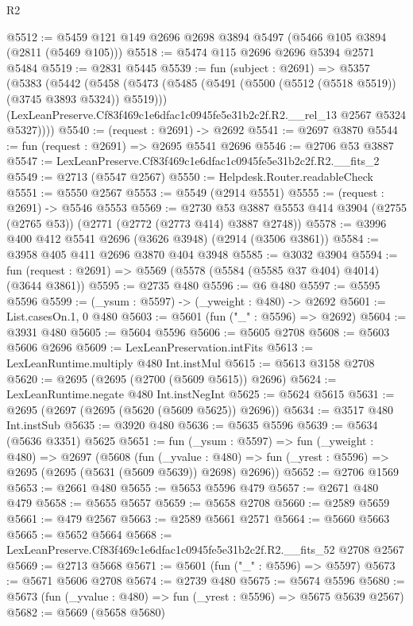 \begin{lexlean}{R2}
\begin{coremodule}
@5512 := @5459 @121 @149 @2696 @2698 @3894 @5497 (@5466 @105 @3894 (@2811 (@5469 @105)))
@5518 := @5474 @115 @2696 @2696 @5394 @2571 @5484
@5519 := @2831 @5445
@5539 := fun (subject : @2691) =>
  @5357
    (@5383
      (@5442
        (@5458
          (@5473 (@5485 (@5491 (@5500 (@5512 (@5518 @5519)) (@3745 @3893 @5324)) @5519)))
          (LexLeanPreserve.Cf83f469c1e6dfac1c0945fe5e31b2c2f.R2.__rel_13 @2567 @5324 @5327))))
@5540 := (request : @2691) -> @2692
@5541 := @2697 @3870
@5544 := fun (request : @2691) => @2695 @5541 @2696
@5546 := @2706 @53 @3887
@5547 := LexLeanPreserve.Cf83f469c1e6dfac1c0945fe5e31b2c2f.R2.__fits_2
@5549 := @2713 (@5547 @2567)
@5550 := Helpdesk.Router.readableCheck
@5551 := @5550 @2567
@5553 := @5549 (@2914 @5551)
@5555 := (request : @2691) -> @5546 @5553
@5569 := @2730
    @53
    @3887
    @5553
    @414
    @3904
    (@2755 (@2765 @53))
    (@2771 (@2772 (@2773 @414) @3887 @2748))
@5578 := @3996 @400 @412 @5541 @2696 (@3626 @3948) (@2914 (@3506 @3861))
@5584 := @3958 @405 @411 @2696 @3870 @404 @3948
@5585 := @3032 @3904
@5594 := fun (request : @2691) => @5569 (@5578 (@5584 (@5585 @37 @404) @4014) (@3644 @3861))
@5595 := @2735 @480
@5596 := @6 @480
@5597 := @5595 @5596
@5599 := (_ysum : @5597) -> (_yweight : @480) -> @2692
@5601 := List.casesOn.{1, 0} @480
@5603 := @5601 (fun ("_" : @5596) => @2692)
@5604 := @3931 @480
@5605 := @5604 @5596
@5606 := @5605 @2708
@5608 := @5603 @5606 @2696
@5609 := LexLeanPreservation.intFits
@5613 := LexLeanRuntime.multiply @480 Int.instMul
@5615 := @5613 @3158 @2708
@5620 := @2695 (@2695 (@2700 (@5609 @5615)) @2696)
@5624 := LexLeanRuntime.negate @480 Int.instNegInt
@5625 := @5624 @5615
@5631 := @2695 (@2697 (@2695 (@5620 (@5609 @5625)) @2696))
@5634 := @3517 @480 Int.instSub
@5635 := @3920 @480
@5636 := @5635 @5596
@5639 := @5634 (@5636 @3351) @5625
@5651 := fun (_ysum : @5597) =>
  fun (_yweight : @480) =>
  @2697
    (@5608
      (fun (_yvalue : @480) =>
      fun (_yrest : @5596) => @2695 (@2695 (@5631 (@5609 @5639)) @2698) @2696))
@5652 := @2706 @1569
@5653 := @2661 @480
@5655 := @5653 @5596 @479
@5657 := @2671 @480 @479
@5658 := @5655 @5657
@5659 := @5658 @2708
@5660 := @2589 @5659
@5661 := @479 @2567
@5663 := @2589 @5661 @2571
@5664 := @5660 @5663
@5665 := @5652 @5664
@5668 := LexLeanPreserve.Cf83f469c1e6dfac1c0945fe5e31b2c2f.R2.__fits_52 @2708 @2567
@5669 := @2713 @5668
@5671 := @5601 (fun ("_" : @5596) => @5597)
@5673 := @5671 @5606 @2708
@5674 := @2739 @480
@5675 := @5674 @5596
@5680 := @5673 (fun (_yvalue : @480) => fun (_yrest : @5596) => @5675 @5639 @2567)
@5682 := @5669 (@5658 @5680)

\end{coremodule}
\end{lexlean}

